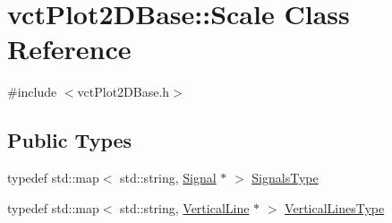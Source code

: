 \hypertarget{classvct_plot2_d_base_1_1_scale}{}\section{vct\+Plot2\+D\+Base\+:\+:Scale Class Reference}
\label{classvct_plot2_d_base_1_1_scale}


{\ttfamily \#include $<$vct\+Plot2\+D\+Base.\+h$>$}

\subsection*{Public Types}
\begin{DoxyCompactItemize}
\item 
typedef std\+::map$<$ std\+::string, \hyperlink{classvct_plot2_d_base_1_1_signal}{Signal} $\ast$ $>$ \hyperlink{classvct_plot2_d_base_1_1_scale_aecdc247557c6ec3b7976596b42a4bc27}{Signals\+Type}
\item 
typedef std\+::map$<$ std\+::string, \hyperlink{classvct_plot2_d_base_1_1_vertical_line}{Vertical\+Line} $\ast$ $>$ \hyperlink{classvct_plot2_d_base_1_1_scale_acd4d4d528f1381dfd1145ceec34b25ba}{Vertical\+Lines\+Type}
\end{DoxyCompactItemize}
